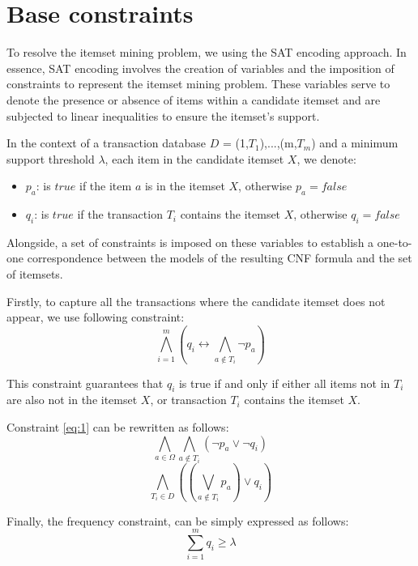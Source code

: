 \section{Base constraints}
To resolve the itemset mining problem, we using the SAT encoding approach\cite{ism_satapproach}.
In essence, SAT encoding involves the creation of variables and the imposition of constraints to represent the itemset mining problem.
These variables serve to denote the presence or absence of items within a candidate itemset and are subjected to linear inequalities to ensure the itemset's support.

In the context of a transaction database $D$ = {(1,$T_1$),...,(m,$T_m$)} and a minimum support threshold $\lambda$,
each item in the candidate itemset $X$, we denote:
\begin{itemize}
    \item $p_a$: is $true$ if the item $a$ is in the itemset $X$, otherwise $p_a = false$
    \item $q_i$: is $true$ if the transaction $T_i$ contains the itemset $X$, otherwise $q_i = false$
\end{itemize}
Alongside, a set of constraints is imposed on these variables to establish a one-to-one correspondence between the models of the resulting CNF formula and the set of itemsets.

Firstly, to capture all the transactions where the candidate itemset does not appear, we use following constraint:
\begin{equation}
    \label{eq:1}
    \bigwedge_{i=1}^{m} (q_i \leftrightarrow \bigwedge_{a \notin T_i} \neg p_a)
\end{equation}

This constraint guarantees that $q_i$ is true if and only if either all items not in $T_i$ are also not in the itemset $X$, or transaction $T_i$ contains the itemset $X$.

Constraint \ref{eq:1} can be rewritten as follows:
\begin{equation}
    \label{eq:2}
    \bigwedge_{a \in \Omega} \bigwedge_{a \notin T_i} (\neg p_a \vee \neg q_i)
\end{equation}
\begin{equation}
    \label{eq:3}
    \bigwedge_{T_i \in D} ((\bigvee_{a \notin T_i} p_a) \vee q_i)
\end{equation}


Finally, the frequency constraint, can be simply expressed as follows:
\begin{equation}
    \label{eq:4}
    \sum_{i=1}^{m} q_i \geq \lambda
\end{equation}

